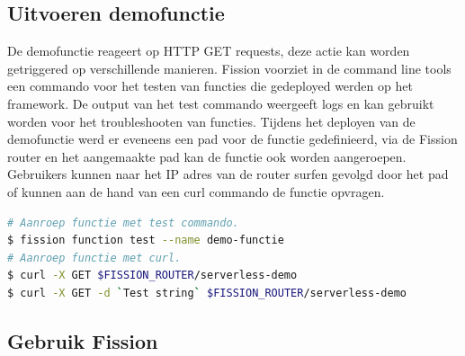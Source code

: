 \subsection{Uitvoeren demofunctie}
De demofunctie reageert op HTTP GET requests, deze actie kan worden getriggered op verschillende manieren. Fission voorziet in de command line tools een commando voor het testen van functies die gedeployed werden op het framework. De output van het test commando weergeeft logs en kan gebruikt worden voor het troubleshooten van functies. Tijdens het deployen van de demofunctie werd er eveneens een pad voor de functie gedefinieerd, via de Fission router en het aangemaakte pad kan de functie ook worden aangeroepen. Gebruikers kunnen naar het IP adres van de router surfen gevolgd door het pad of kunnen aan de hand van een curl commando de functie opvragen.

\begin{lstlisting}[language=bash]
# Aanroep functie met test commando.
$ fission function test --name demo-functie
# Aanroep functie met curl.
$ curl -X GET $FISSION_ROUTER/serverless-demo
$ curl -X GET -d `Test string` $FISSION_ROUTER/serverless-demo
\end{lstlisting}

\subsection{Gebruik Fission}
